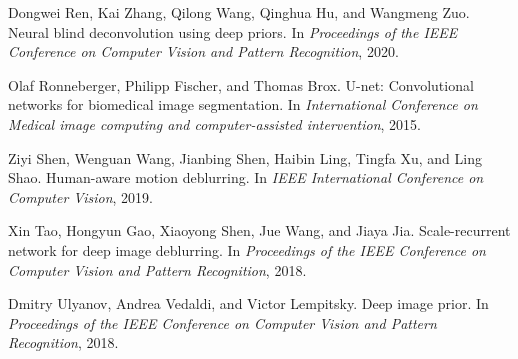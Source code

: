 \documentclass[final]{cvpr}
\begin{document}
{\begin{thebibliography}{12}
Dongwei Ren, Kai Zhang, Qilong Wang, Qinghua Hu, and Wangmeng Zuo.
\newblock Neural blind deconvolution using deep priors.
\newblock In \emph{Proceedings of the {IEEE} Conference on Computer Vision and
  Pattern Recognition}, 2020.

Olaf Ronneberger, Philipp Fischer, and Thomas Brox.
\newblock U-net: Convolutional networks for biomedical image segmentation.
\newblock In \emph{International Conference on Medical image computing and
  computer-assisted intervention}, 2015.

Ziyi Shen, Wenguan Wang, Jianbing Shen, Haibin Ling, Tingfa Xu, and Ling Shao.
\newblock Human-aware motion deblurring.
\newblock In \emph{IEEE International Conference on Computer Vision}, 2019.

Xin Tao, Hongyun Gao, Xiaoyong Shen, Jue Wang, and Jiaya Jia.
\newblock Scale-recurrent network for deep image deblurring.
\newblock In \emph{Proceedings of the {IEEE} Conference on Computer Vision and
  Pattern Recognition}, 2018.

Dmitry Ulyanov, Andrea Vedaldi, and Victor Lempitsky.
\newblock Deep image prior.
\newblock In \emph{Proceedings of the {IEEE} Conference on Computer Vision and
  Pattern Recognition}, 2018.

\end{thebibliography}
}
\end{document}
